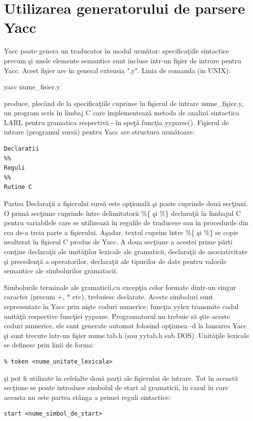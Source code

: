 \section{Utilizarea generatorului de parsere Yacc}
Yacc poate genera un traducator \^{i}n modul urm\u{a}tor: specifica\c{t}iile sintactice precum \c{s}i unele elemente semantice sunt incluse \u{i}ntr-un fi\c{s}ier de intrare pentru Yacc. Acest fi\c{s}ier are \^{i}n general extensia ".y". Linia de comanda (in UNIX):
\begin{center}
yacc nume\_fisier.y
\end{center}
produce, plec\^{a}nd de la specifica\c{t}iile cuprinse \^{i}n fi\c{s}ierul de intrare nume\_fi\c{s}ier.y, un program scris \^{i}n limbaj C care implementeaz\u{a} metoda de analiz\u{a} sintactica LARL pentru gramatica respectiv\u{a} - \^{i}n spe\c{t}\u{a} func\c{t}ia yyparse(). Fi\c{s}ierul de intrare (programul surs\u{a}) pentru Yacc are structura urm\u{a}toare:
\begin{verbatim}
Declaratii
%%
Reguli
%%
Rutine C
\end{verbatim}

Partea Declara\c{t}ii a fi\c{s}ierului surs\u{a} este op\c{t}ional\u{a} \c{s}i poate cuprinde dou\u{a} sec\c{t}iuni. O prim\u{a} sec\c{t}iune cuprinde \^{i}ntre delimitatorii \%\{ \c{s}i \%\} declara\c{t}ii \^{i}n limbajul C pentru variabilele care se utilizeaz\u{a} \^{i}n regulile de traducere sau \^{i}n procedurile din cea de-a treia parte a fi\c{s}ierului. A\c{s}adar, textul cuprins \^{i}ntre \%\{ \c{s}i \%\} se copie nealterat \^{i}n fi\c{s}ierul C produs de Yacc. A doua sec\c{t}iune a acestei prime p\u{a}rti con\c{t}ine declara\c{t}ii ale unit\u{a}\c{t}ilor lexicale ale gramaticii, declara\c{t}ii de asociativitate \c{s}i preceden\c{t}\u{a} a operatorilor, declara\c{t}ii ale tipurilor de date pentru valorile semantice ale simbolurilor gramatacii.

Simbolurile terminale ale gramaticii,cu excep\c{t}ia celor formate dintr-un singur caracter (precum +, * etc), trebuiesc declarate. Aceste simboluri sunt reprezentate \^{i}n Yacc prin ni\c{s}te coduri numerice; func\c{t}ia yylex transmite codul unit\u{a}\c{t}ii respective func\c{t}iei yyparse. Programatorul nu trebuie s\u{a} \c{s}tie aceste coduri numerice, ele sunt generate automat folosind op\c{t}iunea -d la lansarea Yacc \c{s}i sunt trecute \^{i}ntr-un fi\c{s}ier nume.tab.h (sau yytab.h sub DOS). Unit\u{a}\c{t}ile lexicale se definesc prin linii de forma:
\begin{verbatim}
% token <nume_unitate_lexicala>
\end{verbatim}
\c{s}i pot fi utilizate \^{i}n celelalte dou\u{a} par\c{t}i ale fi\c{s}ierului de intrare. Tot \^{i}n aceast\u{a} sec\c{t}iune se poate introduce simbolul de start al gramaticii, \^{i}n cazul \^{i}n care aceasta nu este partea st\^{a}nga a primei reguli sintactice:
\begin{verbatim}
start <nume_simbol_de_start>
\end{verbatim}

